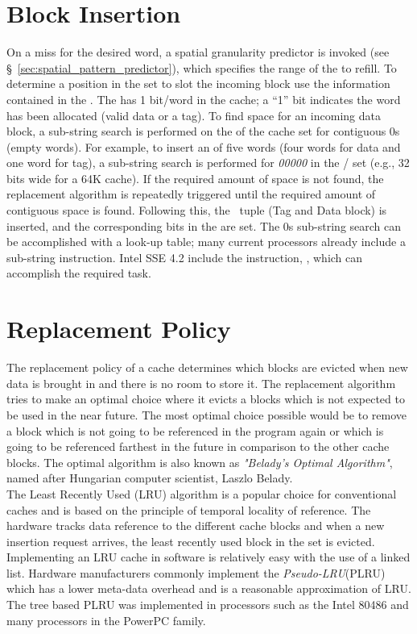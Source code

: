 \clearpage

\section{Block Insertion}

On a miss for the desired word, a spatial granularity predictor is invoked (see \S~\ref{sec:spatial_pattern_predictor}), which specifies the range of the \AB{} to refill. To determine a position in the set to slot the incoming block use the information contained in the . The  has 1 bit/word in the cache; a ``1'' bit indicates the word has been allocated (valid data or a tag). To find space for an incoming data block, a sub-string search is performed on the  of the cache set for contiguous 0s (empty words). For example, to insert an \AB{} of five words (four words for data and one word for tag), a sub-string search is performed for \textit{00000} in the  / set (e.g., 32 bits wide for a 64K cache). If the required amount of space is not found, the replacement algorithm is repeatedly triggered until the required amount of contiguous space is found. Following this, the \AB\ tuple (Tag and Data block) is inserted, and the corresponding bits in the  are set. The 0s sub-string search can be accomplished with a look-up table; many current processors already include a sub-string instruction. Intel SSE 4.2 include the instruction, , which can accomplish the required task.

\section{Replacement Policy}
\label{sec:replacement_policy}
The replacement policy of a cache determines which blocks are evicted when new data is brought in and there is no room to store it. The replacement algorithm tries to make an optimal choice where it evicts a blocks which is not expected to be used in the near future. The most optimal choice possible would be to remove a block which is not going to be referenced in the program again or which is going to be referenced farthest in the future in comparison to the other cache blocks. The optimal algorithm is also known as \textit{"Belady's Optimal Algorithm"}, named after Hungarian computer scientist, Laszlo Belady.
\\

The Least Recently Used (LRU) algorithm is a popular choice for conventional caches and is based on the principle of temporal locality of reference. The hardware tracks data reference to the different cache blocks and when a new insertion request arrives, the least recently used block in the set is evicted. Implementing an LRU cache in software is relatively easy with the use of a linked list. Hardware manufacturers commonly implement the \textit{Pseudo-LRU}(PLRU) which has a lower meta-data overhead and is a reasonable approximation of LRU. The tree based PLRU was implemented in processors such as the Intel 80486 and many processors in the PowerPC family. 

